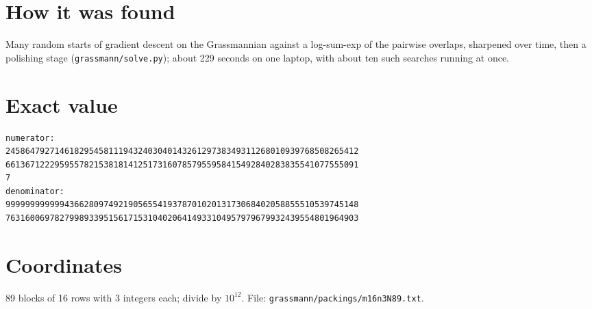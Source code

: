 \documentclass[11pt,a4paper]{article}
\begin{document}
\section{How it was found}
Many random starts of gradient descent on the Grassmannian against a log-sum-exp of the pairwise overlaps, sharpened over time, then a polishing stage (\texttt{grassmann/solve.py}); about 229 seconds on one laptop, with about ten such searches running at once.


\appendix
\section{Exact value}
{\small
\begin{verbatim}
numerator:
245864792714618295458111943240304014326129738349311268010939768508265412
661367122295955782153818141251731607857955958415492840283835541077555091
7
denominator:
999999999999436628097492190565541937870102013173068402058855510539745148
763160069782799893395156171531040206414933104957979679932439554801964903
\end{verbatim}}

\section{Coordinates}
89 blocks of 16 rows with 3 integers each; divide by $10^{12}$. File: \texttt{grassmann/packings/m16n3N89.txt}.
{\tiny
\begin{multicols}{3}
\end{multicols}}
\end{document}
